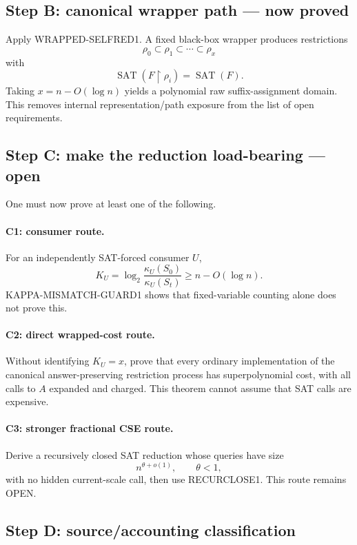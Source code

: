 \documentclass[11pt]{article}
\theoremstyle{plain}
\theoremstyle{definition}
\theoremstyle{remark}
\begin{document}
\subsection{Step B: canonical wrapper path --- now proved}

Apply WRAPPED-SELFRED1.  A fixed black-box wrapper produces restrictions
\[
\rho_0\subset\rho_1\subset\cdots\subset\rho_x
\]
with
\[
\operatorname{SAT}(F\upharpoonright\rho_i)
=
\operatorname{SAT}(F).
\]
Taking \(x=n-O(\log n)\) yields a polynomial raw suffix-assignment domain.
This removes internal representation/path exposure from the list of open
requirements.

\subsection{Step C: make the reduction load-bearing --- open}

One must now prove at least one of the following.

\paragraph{C1: consumer route.}
For an independently SAT-forced consumer \(U\),
\[
K_U
=
\log_2\frac{\kappa_U(S_0)}{\kappa_U(S_t)}
\ge n-O(\log n).
\]
KAPPA-MISMATCH-GUARD1 shows that fixed-variable counting alone does not prove
this.

\paragraph{C2: direct wrapped-cost route.}
Without identifying \(K_U=x\), prove that every ordinary implementation of
the canonical answer-preserving restriction process has superpolynomial
cost, with all calls to \(A\) expanded and charged.  This theorem cannot
assume that SAT calls are expensive.

\paragraph{C3: stronger fractional CSE route.}
Derive a recursively closed SAT reduction whose queries have size
\[
n^{\theta+o(1)},\qquad \theta<1,
\]
with no hidden current-scale call, then use RECURCLOSE1.  This route remains
OPEN.

\subsection{Step D: source/accounting classification}
\end{document}
